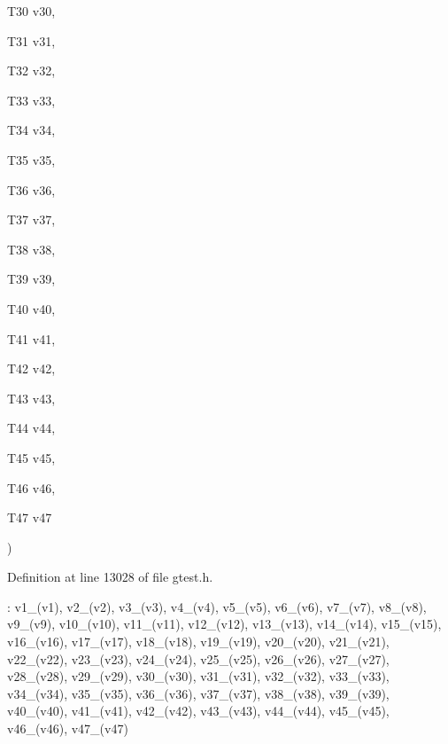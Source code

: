 {{\begin{DoxyParamCaption}
\item[{\-T30}]{v30, }
\item[{\-T31}]{v31, }
\item[{\-T32}]{v32, }
\item[{\-T33}]{v33, }
\item[{\-T34}]{v34, }
\item[{\-T35}]{v35, }
\item[{\-T36}]{v36, }
\item[{\-T37}]{v37, }
\item[{\-T38}]{v38, }
\item[{\-T39}]{v39, }
\item[{\-T40}]{v40, }
\item[{\-T41}]{v41, }
\item[{\-T42}]{v42, }
\item[{\-T43}]{v43, }
\item[{\-T44}]{v44, }
\item[{\-T45}]{v45, }
\item[{\-T46}]{v46, }
\item[{\-T47}]{v47}
\end{DoxyParamCaption}
)}}\label{d6/d6c/classtesting_1_1internal_1_1ValueArray47_a86b55bedd7ea775566cd91ce64e99255}


\-Definition at line 13028 of file gtest.\-h.


\begin{DoxyCode}
                                                            : v1_(v1), v2_(v2),
      v3_(v3), v4_(v4), v5_(v5), v6_(v6), v7_(v7), v8_(v8), v9_(v9), v10_(v10),
      v11_(v11), v12_(v12), v13_(v13), v14_(v14), v15_(v15), v16_(v16),
      v17_(v17), v18_(v18), v19_(v19), v20_(v20), v21_(v21), v22_(v22),
      v23_(v23), v24_(v24), v25_(v25), v26_(v26), v27_(v27), v28_(v28),
      v29_(v29), v30_(v30), v31_(v31), v32_(v32), v33_(v33), v34_(v34),
      v35_(v35), v36_(v36), v37_(v37), v38_(v38), v39_(v39), v40_(v40),
      v41_(v41), v42_(v42), v43_(v43), v44_(v44), v45_(v45), v46_(v46),
      v47_(v47) {}
\end{DoxyCode}


